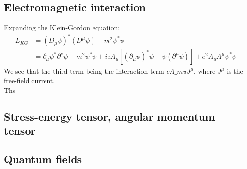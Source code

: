 \documentclass[12pt,a4paper]{article}
\begin{document}
    \subsection{Electromagnetic interaction}
    Expanding the Klein-Gordon equation:
    \begin{align*}
        L_{KG}&=(D_\mu\psi)^*(D^\mu\psi) - m^2\psi^*\psi\\
        &= \partial_\mu\psi^*\partial^\mu\psi-m^2\psi^*\psi+ieA_\mu[(\partial_\mu\psi)^*\psi-\psi(\partial^\mu\psi)]+e^2A_{\mu}A^\mu\psi^*\psi
    \end{align*}
    We see that the third term being the interaction term $eA\_muJ^\mu$, where $J^\mu$ is the free-field current.\\
    The 
    \subsection{Stress-energy tensor, angular momentum tensor}
    \subsection{Quantum fields}
\end{document}
